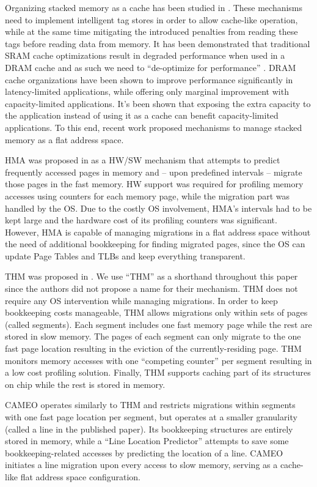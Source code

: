 Organizing stacked memory as a cache has been studied in \cite{qureshi-micro2012,BEAR,BIMODAL,citadel,tagless-dram-cache,UNISON}. These mechanisms need to implement intelligent tag stores in order to allow cache-like operation, while at the same time mitigating the introduced penalties from reading these tags before reading data from memory. It has been demonstrated that traditional SRAM cache optimizations result in degraded performance when used in a DRAM cache and as such we need to ``de-optimize for performance'' \cite{qureshi-micro2012}. DRAM cache organizations have been shown to improve performance significantly in latency-limited applications, while offering only marginal improvement with capacity-limited applications. It's been shown that exposing the extra capacity to the application instead of using it as a cache can benefit capacity-limited applications. To this end, recent work \cite{??} proposed mechanisms to manage stacked memory as a flat address space. 

HMA was proposed in \cite{meswani-HPCA21} as a HW/SW mechanism that attempts to predict frequently accessed pages in memory and -- upon predefined intervals -- migrate those pages in the fast memory. HW support was required for profiling memory accesses using counters for each memory page, while the migration part was handled by the OS. Due to the costly OS involvement, HMA's intervals had to be kept large and the hardware cost of its profiling counters was significant. However, HMA is capable of managing migrations in a flat address space without the need of additional bookkeeping for finding migrated pages, since the OS can update Page Tables and TLBs and keep everything transparent.

THM was proposed in \cite{sim-micro2014}. We use ``THM'' as a shorthand throughout this paper since the authors did not propose a name for their mechanism. THM does not require any OS intervention while managing migrations. In order to keep bookkeeping costs manageable, THM allows migrations only within sets of pages (called segments). Each segment includes one fast memory page while the rest are stored in slow memory. The pages of each segment can only migrate to the one fast page location resulting in the eviction of the currently-residing page. THM monitors memory accesses with one ``competing counter'' per segment resulting in a low cost profiling solution. Finally, THM supports caching part of its structures on chip while the rest is stored in memory.

CAMEO \cite{cameo} operates similarly to THM and restricts migrations within segments with one fast page location per segment, but operates at a smaller granularity (called a line in the published paper). Its bookkeeping structures are entirely stored in memory, while a ``Line Location Predictor'' attempts to save some bookkeeping-related accesses by predicting the location of a line. CAMEO initiates a line migration upon every access to slow memory, serving as a cache-like flat address space configuration.

